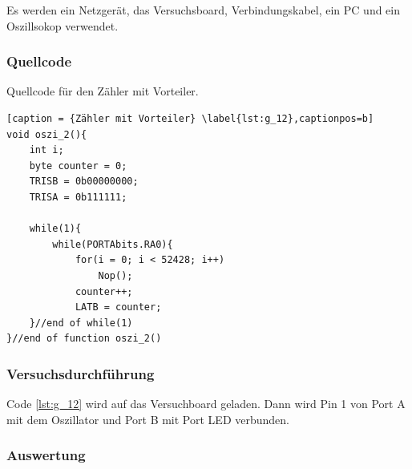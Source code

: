 \documentclass[12pt,a4paper]{article}
\begin{document}
Es werden ein Netzgerät, das Versuchsboard, Verbindungskabel, ein PC und ein Oszillsokop verwendet.

\subsubsection*{Quellcode}

Quellcode für den Zähler mit Vorteiler.

\lstset{language=C, basicstyle=\tiny}
\begin{lstlisting}[caption = {Zähler mit Vorteiler} \label{lst:g_12},captionpos=b]
void oszi_2(){
	int i;
	byte counter = 0;
	TRISB = 0b00000000;
	TRISA = 0b111111;
	
	while(1){
		while(PORTAbits.RA0){
			for(i = 0; i < 52428; i++)
				Nop();
			counter++;
			LATB = counter;
	}//end of while(1)
}//end of function oszi_2()
\end{lstlisting}

\subsubsection*{Versuchsdurchführung}

Code \ref{lst:g_12} wird auf das Versuchboard geladen. Dann wird Pin 1 von Port A mit dem Oszillator und Port B mit Port LED verbunden.


\subsubsection*{Auswertung}
\end{document}
